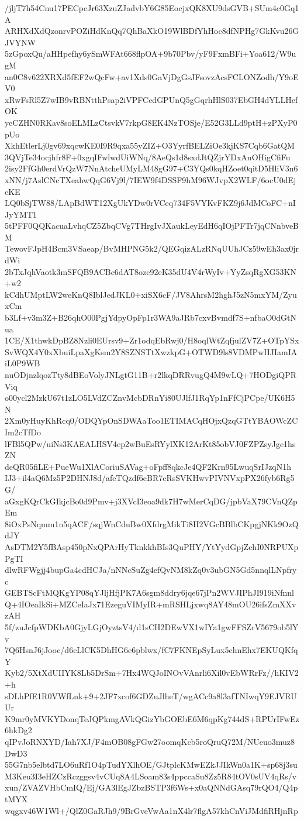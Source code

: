 /jljT7h54Cnu17PECpeJr63XzuZJadvbY6G85EocjxQK8XU9dsGVB+SUm4c0Gq1A
ARHXdXdQzonrvPOZiHdKnQq7QhBaXkO19WlBDfYhHoc8dfNPHg7GkKvu26GJVYNW
5zGpoxQu/aHHpefhy6ySmWFAt668flpOA+9b70Pbv/yF9FxmBFi+Yoa612/W9ugM
an0C8v622XRXd5fEF2wQcFw+av1Xds0GaVjDgGsJFsovzAcsFCLONZodh/Y9oEV0
xRwFsRl5Z7wIB9vRBNtthPsap2iVPFCedGPUnQ5gGqrhHlS037EbGH4dYLLHcfOK
yeCZHN0RKav8soELMLzCtsvkV7rkpG8EK4NzTOSje/E52G3LLd9ptH+zPXyP0pUo
XkhEtlerLj0gv69xqcwKE0I9R9qxa55yZIZ+O3YyrfBELZiOe3kjKS7Cqb6GatQM
3QVjTe34ocjhfr8F+0xgqIFwlwdUiWNq/8AeQs1d8sxdJtQZjrYDxAnOHigCfiFu
2isy2FfGh0erdVrQzW7NnAtcheUMyLM48gG97+C3YQs0kqHZoet0qitD5HliV3n6
xNN/j7AslCNcTXeahwQqG6Vj9l/7IEW9f4DSSF9hM96WJvpX2WLF/6ocU0dEjcKE
LQ0bSjTW88/LApBdWT12XgUkYDw0rVCeq734F5VYKvFKZ9j6JdMCoFC+nIJyYMT1
5tPFF0QQKacuaLvhqCZ5ZbqCVg7THrgIvJXaukLeyEdH6qIOjPFTr7jqCNnbveBM
TewovFJpH4Bcm3VSaeap/BvMHPNG5k2/QEGqizALzRNqUUhJCz59wEh3ax0jrdWi
2bTxJqhVaotk3mSFQB9ACBc6dAT8ozc92eK35dU4V4rWyIv+YyZsqRgXG53KN+w2
kCdhUMptLW2weKnQ8IblJedJKL0+xiSX6cF/JV8AhrsM2hghJ5zN5mxYM/ZyuxCm
b3Lf+v3m3Z+B26qhO00PgjYdpyOpFp1r3WA9aJRb7cxvBvmdf7S+nfbaO0dGtNua
1CE/X1thwkDpBZ8Nzli0EUrsv9+Zr1odqEbRwj0/H8oqlWtZqfjulZV7Z+OTpYSx
SvWQX4Y0xXbuiLpaXgKsm2Y8SZNSTtXwzkpG+OTWD9ls8VDMPwHJIamIAiL0P9WB
nuODjnzlqozTty8dBEoVolyJNLgtG11B+r2lkqDRRvugQ4M9wLQ+7HODgiQPRViq
o00ycl2MzkU67t1zLO5LVdZCZnvMcbDRnYi80UJlfJ1RqYp1nFfCjPCpe/UK6H5N
2Xm0yHuyKhRcq0/ODQYpOnSDWAaToo1ETIMACqHOjxQzqGTtYBAOWcZCIm2cTfDo
lFBl5QPw/uiNs3KAEALHSV4ep2wBuEsRYylXK12ArKt85obVJ0FZPZsyJge1hsZN
deQR05fiLE+PueWu1XlACoriuSAVag+oFpff8qkcJe4QF2Krn95LwuqSrIJzqN1h
IJ3+il4aQ6Mz5P2DHNJ8d/afeTQzdf6eBR7cRsSVKHwvPIVNVxpPX26fyb6Rg5G/
aGxgKQrCkGIkjcBo0d9Pmv+j3XVcI3eoa9dk7H7wMerCqDG/jpbVaX79CVnQZpEm
8iOxPsNqmm1n5qACF/sqjWnCduBw0XfdrgMikTi8H2VGcBBlbCKpgjNKk9OzQdJY
AsDTM2Y5fBAsp450pNxQPArHyTknkkhBIs3QuPHY/YtYydGpjZehI0NRPUXpPgTI
dlwRFWgjj4bupGa4cdHCJa/nNNcSuZg4efQvNM8kZq0v3ubGN5Gd5nnqlLNpfryc
GEBTScFtMQKgYP08qYJljHfjPK7A6sgm8ddry6jqe67jPn2WVJIPhJI919iNfnnl
Q+4IOeaIkSi+MZCeIaJx71EzeguVIMyIR+mRSHLjxwq8AY48mOU26ifsZmXXvzAH
5f/zuJcfpWDKbA0GjyLGjOyztsV4/d1sCH2DEwVX1wIYa1gwFFSZrV5679ob5lYv
7Q6HsnJ6jJooc/d6cLlCK5DhHG6e6pblwx/fC7FKNEpSyLux5ehnEhx7EKUQKfqY
Kyb2/5XtXdUIIYK8Lb5DrSm+7Hx4WQJoINOvVAnrli6Xil0vEbWRrFz//hKIV2+h
sDLhPfE1R0VWfLnk+9+2JF7xcof6GDZuJlheT/wgACc9a8l3afTNIwqY9EJVRUUr
K9mr0yMVKYDonqTeJQPkmgAVkQGizYbGOEbE6M6qpKg744dS+RPUrIFwEz6hkDg2
qIPvJoRNXYD/Iah7XJ/F4mOB08gFGw27oomqKcb5roQruQ72M/NUeuo3muz8DwD3
55G7nb5elbtd7LO6uRf1O4pTudYXlhOE/GJtplcKMwEZkJJIkWn0a1K+sp68j3su
M3Keu3I3eHZCzRczggsv4vCUq8A4LSoam83s4ppccaSu8Zz5R84tOV0sUV4qRs/v
xun/ZVAZVHbCmIQ/Ej/GA3lEgJZbzBSTP3f6Ws+x0aQNNdGAsq79rQO4/Q4ptMYX
wqgxv46W1Wl+/QlZ0GaRJh9/9BrGveVwAa1nX4lr7flgA57khCnViJMdfiRHjnRp
